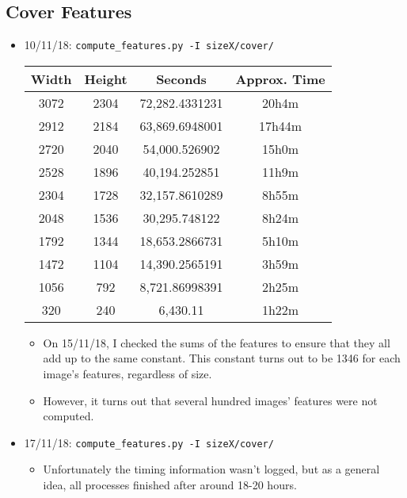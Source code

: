 \documentclass[11pt,a4paper]{report}
\begin{document}
\subsection{Cover Features}
\begin{itemize}
\item 10/11/18: \texttt{compute\_features.py -I sizeX/cover/}
  \begin{center}
  \begin{tabular}{ c c | c c }
  Width & Height & Seconds & Approx. Time \\ \hline
  3072 & 2304 & 72,282.4331231 & 20h4m \\
  2912 & 2184 & 63,869.6948001 & 17h44m \\
  2720 & 2040 & 54,000.526902 & 15h0m \\
  2528 & 1896 & 40,194.252851 & 11h9m \\
  2304 & 1728 & 32,157.8610289 & 8h55m \\
  2048 & 1536 & 30,295.748122 & 8h24m \\
  1792 & 1344 & 18,653.2866731 & 5h10m \\
  1472 & 1104 & 14,390.2565191 & 3h59m \\
  1056 & 792 & 8,721.86998391 & 2h25m \\
  320 & 240 & 6,430.11 & 1h22m \\
  \end{tabular}
  \end{center}

  \begin{itemize}
  \item On 15/11/18, I checked the sums of the features to ensure that they all add up to the same constant. This constant turns out to be 1346 for each image's features, regardless of size.
  \item However, it turns out that several hundred images' features were not computed.
  \end{itemize}

\item 17/11/18: \texttt{compute\_features.py -I sizeX/cover/}
  \begin{itemize}
  \item Unfortunately the timing information wasn't logged, but as a general idea, all processes finished after around 18-20 hours.
  \end{itemize}
\end{itemize}
\end{document}
